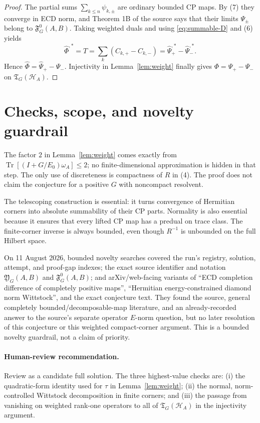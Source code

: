 \documentclass[11pt]{article}
\newcommand{\T}{\mathfrak T}
\newcommand{\Y}{\mathfrak Y}
\newcommand{\F}{\mathfrak F}
\newcommand{\cH}{\mathcal H}
\newcommand{\Tr}{\operatorname{Tr}}
\begin{document}
\begin{proof}
The partial sums $\sum_{k\leq n}\psi_{k,\pm}$ are ordinary bounded CP
maps.  By (7) they converge in ECD norm, and Theorem 1B of the source says
that their limits $\Psi_\pm$ belong to $\F_G^0(A,B)$.  Taking weighted
duals and using \eqref{eq:summable-D} and (6) yields
\[
 \widehat\Phi^{,*}=T
 =\sum_k(C_{k,+}-C_{k,-})
 =\widehat\Psi_+^{,*}-\widehat\Psi_-^{,*}.
\]
Hence $\widehat\Phi=\widehat\Psi_+-\widehat\Psi_-$.  Injectivity in
Lemma~\ref{lem:weight} finally gives
$\Phi=\Psi_+-\Psi_-$ on $\T_G(\cH_A)$.
\end{proof}

\section{Checks, scope, and novelty guardrail}

The factor $2$ in Lemma~\ref{lem:weight} comes exactly from
$\Tr[(I+G/E_0)\omega_A]\leq2$; no finite-dimensional approximation is
hidden in that step.  The only use of discreteness is compactness of $R$ in
(4).  The proof does not claim the conjecture for a positive $G$ with
noncompact resolvent.

The telescoping construction is essential: it turns convergence of
Hermitian corners into absolute summability of their CP parts.  Normality is
also essential because it ensures that every lifted CP map has a predual on
trace class.  The finite-corner inverse is always bounded, even though
$R^{-1}$ is unbounded on the full Hilbert space.

On 11 August 2026, bounded novelty searches covered the run's registry,
solution, attempt, and proof-gap indexes; the exact source identifier and
notation $\Y_G(A,B)$ and $\F_G^0(A,B)$; and arXiv/web-facing variants of
``ECD completion difference of completely positive maps'', ``Hermitian
energy-constrained diamond norm Wittstock'', and the exact conjecture text.
They found the source, general completely bounded/decomposable-map
literature, and an already-recorded answer to the source's separate operator
$E$-norm question, but no later resolution of this conjecture or this
weighted compact-corner argument.  This is a bounded novelty guardrail, not
a claim of priority.

\paragraph{Human-review recommendation.}
Review as a candidate full solution.  The three highest-value checks are:
(i) the quadratic-form identity used for $\tau$ in
Lemma~\ref{lem:weight}; (ii) the normal, norm-controlled Wittstock
decomposition in finite corners; and (iii) the passage from vanishing on
weighted rank-one operators to all of $\T_G(\cH_A)$ in the injectivity
argument.
\end{document}
